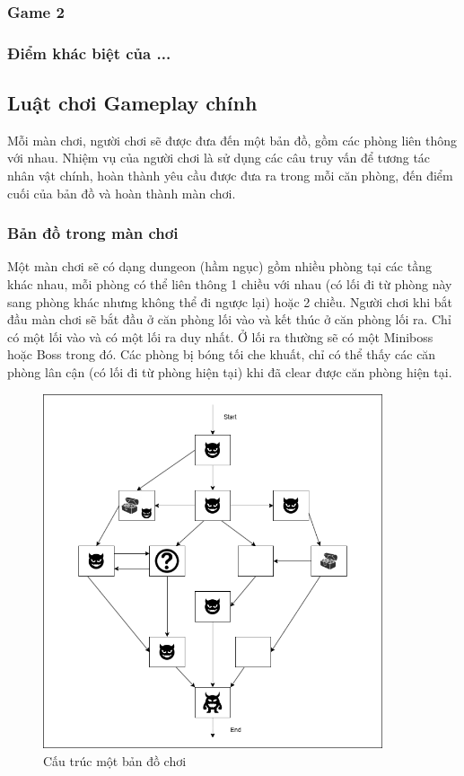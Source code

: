 \subsubsection{Game 2}
\subsubsection{Điểm khác biệt của ...}

\subsection{Luật chơi Gameplay chính}
\hspace*{1cm} Mỗi màn chơi, người chơi sẽ được đưa đến một bản đồ, gồm các phòng liên thông với nhau. Nhiệm vụ của người chơi là sử dụng các câu truy vấn để tương tác nhân vật chính, hoàn thành yêu cầu được đưa ra trong mỗi căn phòng, đến điểm cuối của bản đồ và hoàn thành màn chơi.

\subsubsection{Bản đồ trong màn chơi}
\hspace*{1cm} Một màn chơi sẽ có dạng dungeon (hầm ngục) gồm nhiều phòng tại các tầng khác nhau, mỗi phòng có thể liên thông 1 chiều với nhau (có lối đi từ phòng này sang phòng khác nhưng không thể đi ngược lại) hoặc 2 chiều. Người chơi khi bắt đầu màn chơi sẽ bắt đầu ở căn phòng lối vào và kết thúc ở căn phòng lối ra. Chỉ có một lối vào và có một lối ra duy nhất. Ở lối ra thường sẽ có một Miniboss hoặc Boss trong đó. Các phòng bị bóng tối che khuất, chỉ có thể thấy các căn phòng lân cận (có lối đi từ phòng hiện tại) khi đã clear được căn phòng hiện tại.\\

\begin{figure}[H]
	\centering
	\includegraphics[width=10cm]{Images/SampleLevel.png}
	\vspace{0.5cm}
	\caption{Cấu trúc một bản đồ chơi}
\end{figure}

